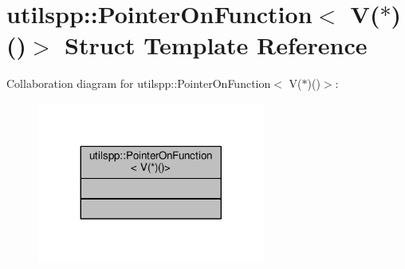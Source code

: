 \hypertarget{structutilspp_1_1PointerOnFunction_3_01V_07_5_08_07_08_4}{\section{utilspp\-:\-:Pointer\-On\-Function$<$ V($\ast$)()$>$ Struct Template Reference}
\label{structutilspp_1_1PointerOnFunction_3_01V_07_5_08_07_08_4}
}


Collaboration diagram for utilspp\-:\-:Pointer\-On\-Function$<$ V($\ast$)()$>$\-:\nopagebreak
\begin{figure}[H]
\begin{center}
\leavevmode
\includegraphics[width=212pt]{structutilspp_1_1PointerOnFunction_3_01V_07_5_08_07_08_4__coll__graph}
\end{center}
\end{figure}

